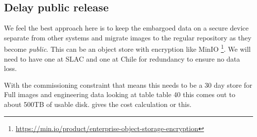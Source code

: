 
\subsection{Delay public release} \label{sec:3delay}

We feel the best approach here is to keep the embargoed data on a secure device separate from other systems and migrate images to the regular repository as they become \emph{public}.
This can be an object store with encryption like MinIO \footnote{\url{ https://min.io/product/enterprise-object-storage-encryption}}.
We will need to have one at SLAC and one at Chile for redundancy to ensure no data loss.

With the commissioning constraint that means this needs to be a 30 day store  for Full images and engineering data looking at 
table table 40 this comes out to about 500TB of usable disk.
 gives the cost calculation or this.


